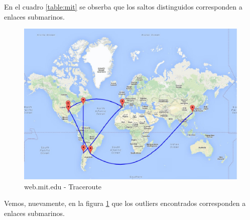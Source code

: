 En el cuadro \ref{table:mit} se obserba que los saltos distinguidos corresponden a enlaces submarinos.


\begin{figure}[H]
    \begin{center}
        \includegraphics[width=1\textwidth]{data/mapa-mit.jpg}
        \caption{web.mit.edu - Traceroute}
        \label{mapa:mit}
    \end{center}
\end{figure}

Vemos, nuevamente, en la figura \ref{mapa:mit} que los outliers encontrados corresponden a enlaces submarinos.

